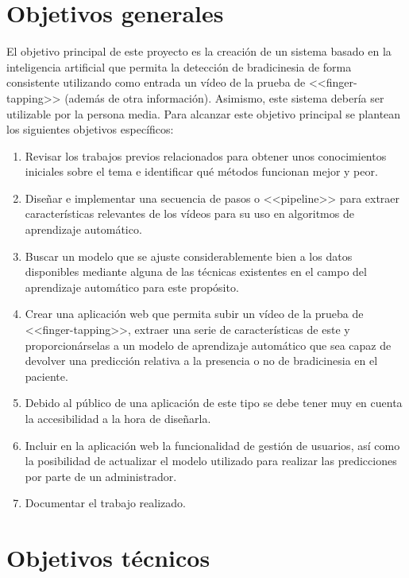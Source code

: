 \label{cha:Objetivos del proyecto}

\section{Objetivos generales}

El objetivo principal de este proyecto es la creación de un sistema basado en la
inteligencia artificial que permita la detección de bradicinesia de forma
consistente utilizando como entrada un vídeo de la prueba de <<finger-tapping>>
(además de otra información). Asimismo, este sistema debería ser utilizable por
la persona media. Para alcanzar este objetivo principal se plantean los
siguientes objetivos específicos:

\begin{enumerate}
    \item Revisar los trabajos previos relacionados para obtener unos
    conocimientos iniciales sobre el tema e identificar qué métodos funcionan
    mejor y peor.
    \item Diseñar e implementar una secuencia de pasos o <<pipeline>> para
    extraer características relevantes de los vídeos para su uso en algoritmos
    de aprendizaje automático.
    \item Buscar un modelo que se ajuste considerablemente bien a los datos
    disponibles mediante alguna de las técnicas existentes en el campo del
    aprendizaje automático para este propósito.
    \item Crear una aplicación web que permita subir un vídeo de la prueba de
    <<finger-tapping>>, extraer una serie de características de este y
    proporcionárselas a un modelo de aprendizaje automático que sea capaz de
    devolver una predicción relativa a la presencia o no de bradicinesia en el
    paciente.
    \item Debido al público de una aplicación de este tipo se debe tener muy en
    cuenta la accesibilidad a la hora de diseñarla.
    \item Incluir en la aplicación web la funcionalidad de gestión de usuarios,
    así como la posibilidad de actualizar el modelo utilizado para realizar las
    predicciones por parte de un administrador.
    \item Documentar el trabajo realizado.
\end{enumerate}

\section{Objetivos técnicos}

